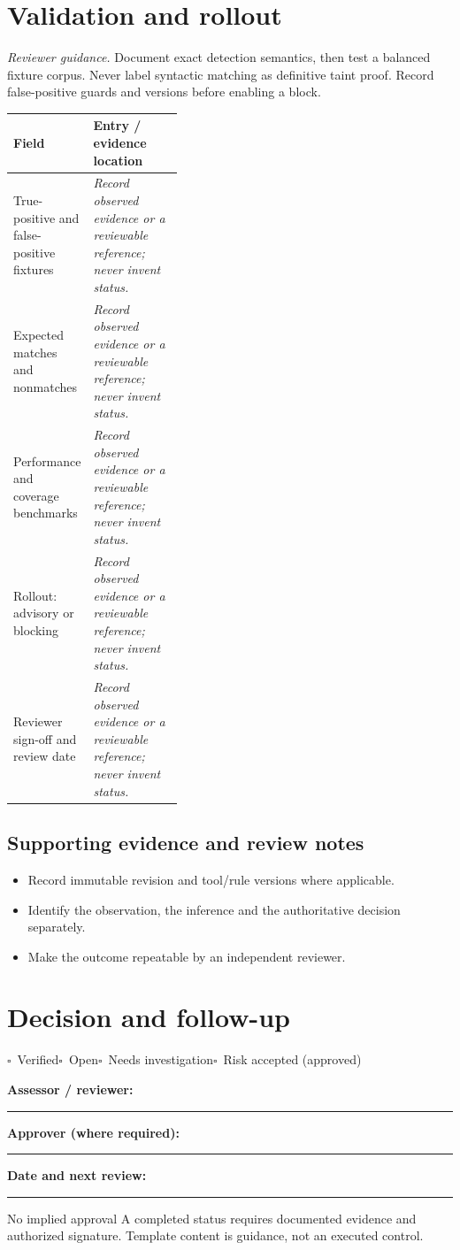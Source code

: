 \documentclass[10pt,letterpaper]{article}
\newcommand{\checkbox}{\(\square\)}
\newcommand{\blankline}{\noindent\rule{\linewidth}{0.35pt}\par\vspace{4pt}}
\begin{document}
\section{Validation and rollout}
\textit{Reviewer guidance.} Document exact detection semantics, then test a balanced fixture corpus. Never label syntactic matching as definitive taint proof. Record false-positive guards and versions before enabling a block.
\begin{tabularx}{\linewidth}{@{}p{0.38\linewidth}Y@{}}
\toprule Field & Entry / evidence location\\\midrule
True-positive and false-positive fixtures & \textit{Record observed evidence or a reviewable reference; never invent status.}\\[1.0em]
\midrule
Expected matches and nonmatches & \textit{Record observed evidence or a reviewable reference; never invent status.}\\[1.0em]
\midrule
Performance and coverage benchmarks & \textit{Record observed evidence or a reviewable reference; never invent status.}\\[1.0em]
\midrule
Rollout: advisory or blocking & \textit{Record observed evidence or a reviewable reference; never invent status.}\\[1.0em]
\midrule
Reviewer sign-off and review date & \textit{Record observed evidence or a reviewable reference; never invent status.}\\[1.0em]
\midrule
\end{tabularx}
\subsection{Supporting evidence and review notes}
\begin{itemize}
\item Record immutable revision and tool/rule versions where applicable.
\item Identify the observation, the inference and the authoritative decision separately.
\item Make the outcome repeatable by an independent reviewer.
\end{itemize}
\clearpage
\section{Decision and follow-up}
\noindent\checkbox\ Verified\quad\checkbox\ Open\quad\checkbox\ Needs investigation\quad\checkbox\ Risk accepted (approved)\par
\noindent\textbf{Assessor / reviewer:}\par\blankline\textbf{Approver (where required):}\par\blankline\textbf{Date and next review:}\par\blankline
\begin{warnbox}{No implied approval}
A completed status requires documented evidence and authorized signature. Template content is guidance, not an executed control.\end{warnbox}
\end{document}
